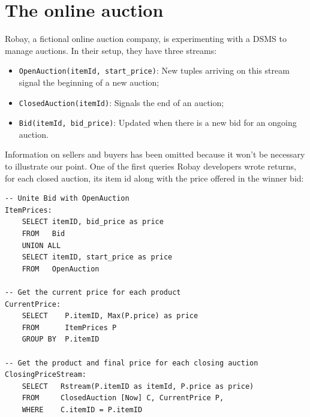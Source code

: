 \documentclass{report}
\begin{document}
\section{The online auction}

Robay, a fictional online auction company, is experimenting with a
DSMS to manage auctions. In their setup, they have three streams:

\begin{itemize}
\item \verb=OpenAuction(itemId, start_price)=: New tuples arriving
  on this stream signal the beginning of a new auction;
\item \verb=ClosedAuction(itemId)=: Signals the end of an auction;
\item \verb=Bid(itemId, bid_price)=: Updated when there is a new bid
  for an ongoing auction.
\end{itemize}

Information on sellers and buyers has been omitted because it won't be
necessary to illustrate our point. One of the first queries Robay
developers wrote returns, for each closed auction, its item id along
with the price offered in the winner bid:

\begin{verbatim}
-- Unite Bid with OpenAuction
ItemPrices:
    SELECT itemID, bid_price as price
    FROM   Bid
    UNION ALL
    SELECT itemID, start_price as price
    FROM   OpenAuction

-- Get the current price for each product
CurrentPrice:
    SELECT    P.itemID, Max(P.price) as price
    FROM      ItemPrices P
    GROUP BY  P.itemID

-- Get the product and final price for each closing auction
ClosingPriceStream:
    SELECT   Rstream(P.itemID as itemId, P.price as price)
    FROM     ClosedAuction [Now] C, CurrentPrice P,
    WHERE    C.itemID = P.itemID
\end{verbatim}
\end{document}
